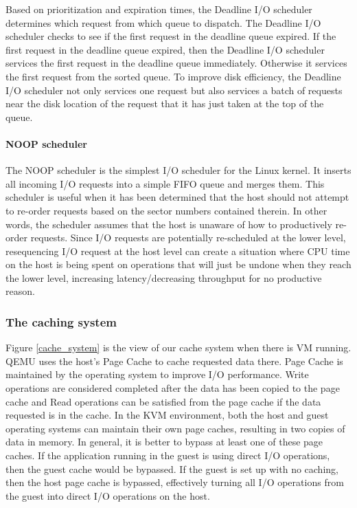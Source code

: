 \documentclass{acmsig}
\begin{document}
    Based on prioritization and expiration times, the Deadline I/O scheduler determines which request from which queue to dispatch. The Deadline I/O scheduler checks to see if the first request in the deadline queue expired. If the first request in the deadline queue expired, then the Deadline I/O scheduler services the first request in the deadline queue immediately. Otherwise it services the first request from the sorted queue. To improve disk efficiency, the Deadline I/O scheduler not only services one request but also services a batch of requests near the disk location of the request that it has just taken at the top of the queue.

    \paragraph{NOOP scheduler}
    The NOOP scheduler is the simplest I/O scheduler for the Linux kernel. It inserts all incoming I/O requests into a simple FIFO queue and merges them. This scheduler is useful when it has been determined that the host should not attempt to re-order requests based on the sector numbers contained therein. In other words, the scheduler assumes that the host is unaware of how to productively re-order requests. Since I/O requests are potentially re-scheduled at the lower level, resequencing I/O request at the host level can create a situation where CPU time on the host is being spent on operations that will just be undone when they reach the lower level, increasing latency/decreasing throughput for no productive reason.

  \subsubsection{The caching system}
  Figure \ref{cache_system} is the view of our cache system when there is VM running. QEMU uses the host's Page Cache to cache requested data there. Page Cache is maintained by the operating system to improve I/O performance. Write operations are considered completed after the data has been copied to the page cache and Read operations can be satisfied from the page cache if the data requested is in the cache. In the KVM environment, both the host and guest operating systems can maintain their own page caches, resulting in two copies of data in memory. In general, it is better to bypass at least one of these page caches. If the application running in the guest is using direct I/O operations, then the guest cache would be bypassed. If the guest is set up with no caching, then the host page cache is bypassed, effectively turning all I/O operations from the guest into direct I/O operations on the host.
\end{document}

